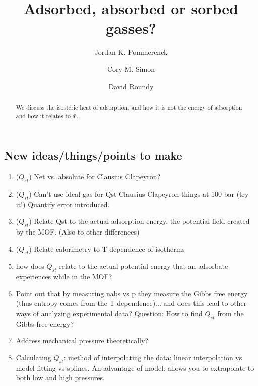 \documentclass[letterpaper,twocolumn,amsmath,amssymb,jcp,aps,10pt]{revtex4-1}
\begin{document}
\title{Adsorbed, absorbed or sorbed gasses?}

\author{Jordan K. Pommerenck}
\author{Cory M. Simon}
\author{David Roundy}

\begin{abstract}
  We discuss the isosteric heat of adsorption, and how it is not the energy of adsorption and how it relates to
  $\Phi$.
\end{abstract}

\maketitle

\subsection{New ideas/things/points to make}
\begin{enumerate}
    \item ($Q_{st}$) Net vs. absolute for Clausius Clapeyron?
    \item ($Q_{st}$) Can't use ideal gas for Qst Clausius Clapeyron things at 100 bar (try it!) Quantify error introduced.
    \item ($Q_{st}$) Relate Qst to the actual adsorption energy, the potential field created by the MOF. (Also to other differences)
    \item ($Q_{st}$) Relate calorimetry to T dependence of isotherms
    \item how does $Q_{st}$ relate to the actual potential energy that an adsorbate experiences while in the MOF?
    \item Point out that by measuring nabs vs p they measure the Gibbs free energy
      (thus entropy comes from the T dependence)...
      and does this lead to other ways of analyzing experimental data?
      Question: How to find $Q_{st}$ from the Gibbs free energy?
    \item Address mechanical pressure theoretically?
    \item Calculating $Q_{st}$: method of interpolating the data: linear interpolation vs model fitting vs splines. An advantage of model: allows you to extrapolate to both low and high pressures.
\end{enumerate}
\end{document}
